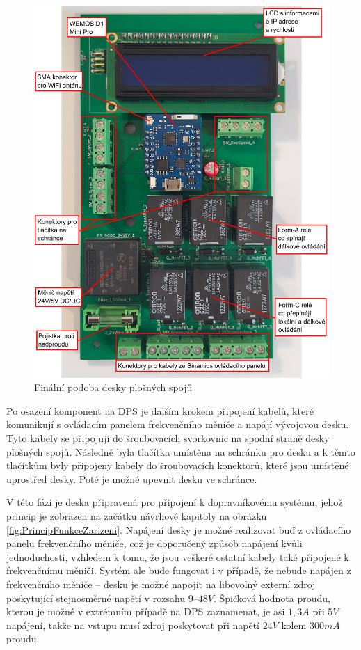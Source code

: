 \begin{figure}[H]
	\centering
	\includegraphics[width=0.95\linewidth]{images/PCB_Final_annotated.jpg}
	\caption{Finální podoba desky plošných spojů}
	\label{fig:PCBFinal}
\end{figure}

Po osazení komponent na DPS je dalším krokem připojení kabelů, které komunikují s ovládacím panelem frekvenčního měniče a napájí vývojovou desku. Tyto kabely se připojují do šroubovacích svorkovnic na spodní straně desky plošných spojů. Následně byla tlačítka umístěna na schránku pro desku a k těmto tlačítkům byly připojeny kabely do šroubovacích konektorů, které jsou umístěné uprostřed desky. Poté je možné upevnit desku ve schránce.

V této fázi je deska připravená pro připojení k dopravníkovému systému, jehož princip je zobrazen na začátku návrhové kapitoly na obrázku \ref{fig:PrincipFunkceZarizeni}. Napájení desky je možné realizovat buď z ovládacího panelu frekvenčního měniče, což je doporučený způsob napájení kvůli jednoduchosti, vzhledem k tomu, že jsou veškeré ostatní kabely také připojené k frekvenčnímu měniči. Systém ale bude fungovat i v případě, že nebude napájen z frekvenčního měniče – desku je možné napojit na libovolný externí zdroj poskytující stejnosměrné napětí v rozsahu $9–48V$. Špičková hodnota proudu, kterou je možné v extrémním případě na DPS zaznamenat, je asi $1,3A$ při $5V$ napájení, takže na vstupu musí zdroj poskytovat při napětí $24V$ kolem $300mA$ proudu.